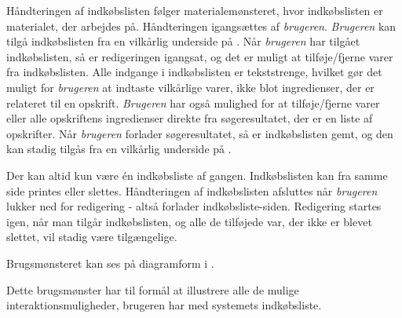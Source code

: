 {Håndteringen af indkøbslisten følger materialemønsteret\cite[p.~128]{ooad}, hvor indkøbslisten er materialet, der arbejdes på. Håndteringen igangsættes af \textit{brugeren}. \textit{Brugeren} kan tilgå indkøbslisten fra en vilkårlig underside på \Foodl. Når \textit{brugeren} har tilgået indkøbslisten, så er redigeringen igangsat, og det er muligt at tilføje/fjerne varer fra indkøbslisten. Alle indgange i indkøbslisten er tekststrenge, hvilket gør det muligt for \textit{brugeren} at indtaste vilkårlige varer, ikke blot ingredienser, der er relateret til \fx en opskrift. \textit{Brugeren} har også mulighed for at tilføje/fjerne varer eller alle opskriftens ingredienser direkte fra søgeresultatet, der er en liste af opskrifter. Når \textit{brugeren} forlader søgeresultatet, så er indkøbslisten gemt, og den kan stadig tilgås fra en vilkårlig underside på \Foodl. 

Der kan altid kun være én indkøbsliste af gangen. Indkøbslisten kan fra samme side printes eller slettes. Håndteringen af indkøbslisten afsluttes når \textit{brugeren} lukker ned for redigering - altså forlader indkøbsliste-siden. Redigering startes igen, når man tilgår indkøbslisten, og alle de tilføjede var, der ikke er blevet slettet, vil stadig være tilgængelige.

Brugsmønsteret kan ses på diagramform i .}
{}
{}
{Dette brugsmønster har til formål at illustrere alle de mulige interaktionsmuligheder, brugeren har med systemets indkøbsliste.}